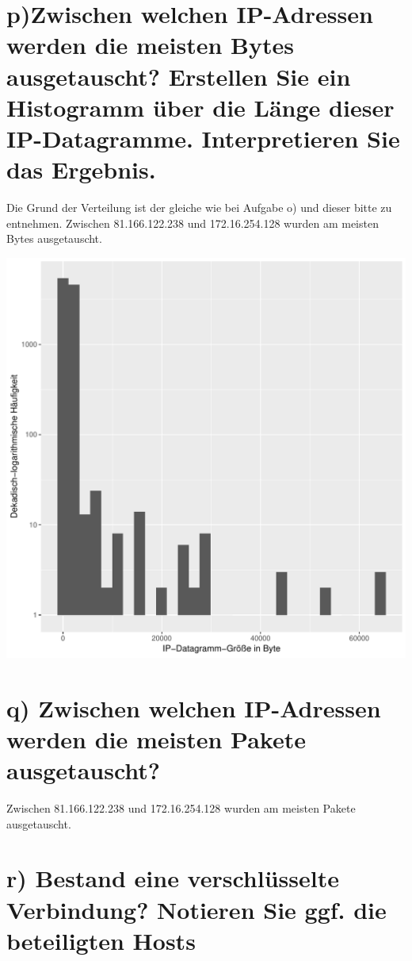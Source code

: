 \documentclass[a4paper, 11pt, fleqn, notitlepage, egregdoesnotlikesansseriftitles]{scrartcl}
\begin{document}
\section{p)Zwischen welchen IP-Adressen werden die meisten Bytes ausgetauscht? Erstellen Sie ein Histogramm über die Länge dieser IP-Datagramme. Interpretieren Sie das Ergebnis.}

Die Grund der Verteilung ist der gleiche wie bei Aufgabe o) und dieser bitte zu entnehmen.
Zwischen 81.166.122.238 und 172.16.254.128 wurden am meisten Bytes ausgetauscht.

\begin{center}
    \includegraphics[width=\textwidth]{length_ausschnitt}
    \label{fig:hist:some}
\end{center}

\section{q) Zwischen welchen IP-Adressen werden die meisten Pakete ausgetauscht?}
Zwischen 81.166.122.238 und 172.16.254.128 wurden am meisten Pakete ausgetauscht.

\section{r) Bestand eine verschlüsselte Verbindung? Notieren Sie ggf. die beteiligten Hosts}
\end{document}

